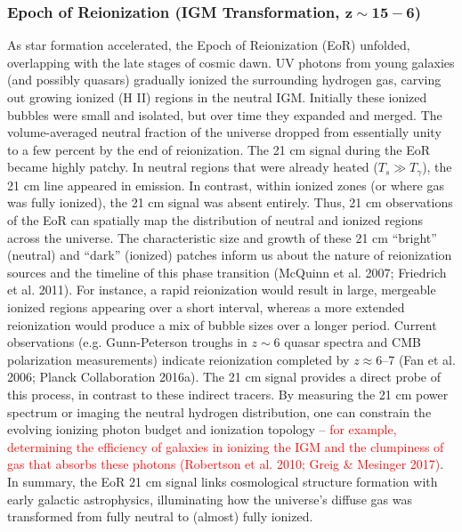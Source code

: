 \documentclass[floats,floatfix,showpacs,amssymb,prd,superscriptaddress,nofootinbib]{revtex4-2} %
\newcommand{\red}{\textcolor{red}}
\begin{document}
\subsubsection{Epoch of Reionization (IGM Transformation, $\mathbf{z \sim 15-6}$)}
As star formation accelerated, the Epoch of Reionization (EoR) unfolded, overlapping with the late stages of cosmic dawn. UV photons from young galaxies (and possibly quasars) gradually ionized the surrounding hydrogen gas, carving out growing ionized (H II) regions in the neutral IGM. Initially these ionized bubbles were small and isolated, but over time they expanded and merged. The volume-averaged neutral fraction of the universe dropped from essentially unity to a few percent by the end of reionization. The 21 cm signal during the EoR became highly patchy. In neutral regions that were already heated ($T_s \gg T_\gamma$), the 21 cm line appeared in emission. In contrast, within ionized zones (or where gas was fully ionized), the 21 cm signal was absent entirely. Thus, 21 cm observations of the EoR can spatially map the distribution of neutral and ionized regions across the universe. The characteristic size and growth of these 21 cm “bright” (neutral) and “dark” (ionized) patches inform us about the nature of reionization sources and the timeline of this phase transition (McQuinn et al. 2007; Friedrich et al. 2011). For instance, a rapid reionization would result in large, mergeable ionized regions appearing over a short interval, whereas a more extended reionization would produce a mix of bubble sizes over a longer period. Current observations (e.g. Gunn-Peterson troughs in $z\sim6$ quasar spectra and CMB polarization measurements) indicate reionization completed by $z\approx6$–7 (Fan et al. 2006; Planck Collaboration 2016a). The 21 cm signal provides a direct probe of this process, in contrast to these indirect tracers. By measuring the 21 cm power spectrum or imaging the neutral hydrogen distribution, one can constrain the evolving ionizing photon budget and ionization topology – \red{for example, determining the efficiency of galaxies in ionizing the IGM and the clumpiness of gas that absorbs these photons (Robertson et al. 2010; Greig \& Mesinger 2017)}. In summary, the EoR 21 cm signal links cosmological structure formation with early galactic astrophysics, illuminating how the universe’s diffuse gas was transformed from fully neutral to (almost) fully ionized.
\end{document}
